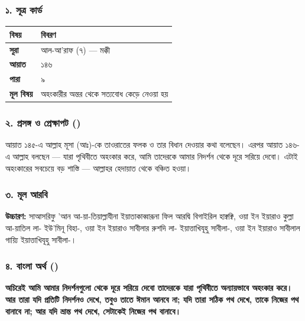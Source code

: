 \subsubsection*{১. সূত্র কার্ড}

\begin{table}[h]\centering\small
\begin{tabular}{ll}
বিষয় & বিবরণ \\
\hline
\textbf{সূরা} & আল-আ'রাফ (৭) — মক্কী \\
\textbf{আয়াত} & ১৪৬ \\
\textbf{পারা} & ৯ \\
\textbf{মূল বিষয়} & অহংকারীর অন্তর থেকে সত্যবোধ কেড়ে নেওয়া হয় \\
\hline
\end{tabular}
\end{table}

\subsubsection*{২. প্রসঙ্গ ও প্রেক্ষাপট ()}

আয়াত ১৪৫-এ আল্লাহ মূসা (আঃ)-কে তাওরাতের ফলক ও তার বিধান দেওয়ার কথা বলেছেন। এরপর আয়াত ১৪৬-এ আল্লাহ বলছেন — যারা পৃথিবীতে অহংকার করে, আমি তাদেরকে আমার নিদর্শন থেকে দূরে সরিয়ে দেবো। এটাই অহংকারের সবচেয়ে বড় শাস্তি — আল্লাহর হেদায়াত থেকে বঞ্চিত হওয়া।

\subsubsection*{৩. মূল আরবি}
\begin{center}\end{center}
\textbf{উচ্চারণ:} সাআসরিফু 'আন আ-য়া-তিয়াল্লাযীনা ইয়াতাকাব্বারূনা ফিল আরদ্বি বিগাইরিল হাক্বক্বি, ওয়া ইন ইয়ারাও কুল্লা আ-য়াতিল লা- ইউ'মিনূ বিহা-, ওয়া ইন ইয়ারাও সাবীলার রুশদি লা- ইয়াত্তাখিযূহু সাবীলা-, ওয়া ইন ইয়ারাও সাবীলাল গায়্যি ইয়াত্তাখিযূহু সাবীলা-।

\subsubsection*{৪. বাংলা অর্থ ()}
\textbf{অচিরেই আমি আমার নিদর্শনগুলো থেকে দূরে সরিয়ে দেবো তাদেরকে যারা পৃথিবীতে অন্যায়ভাবে অহংকার করে। আর তারা যদি প্রতিটি নিদর্শনও দেখে, তবুও তাতে ঈমান আনবে না; যদি তারা সঠিক পথ দেখে, তাকে নিজের পথ বানাবে না; আর যদি ভ্রান্ত পথ দেখে, সেটাকেই নিজের পথ বানাবে।}

